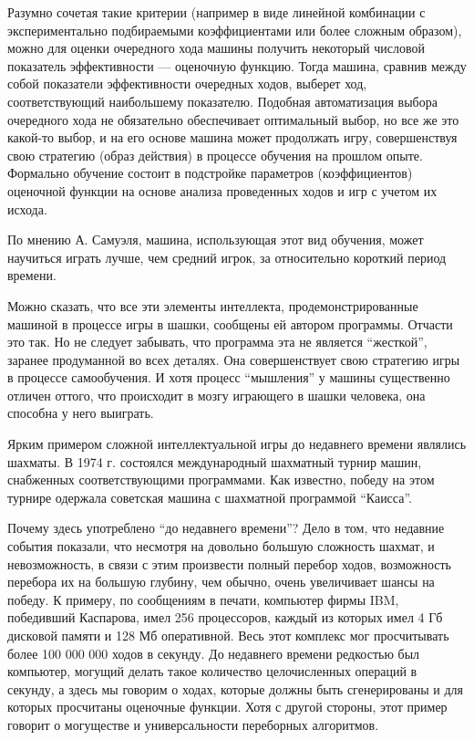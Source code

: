 Разумно сочетая такие критерии (например в виде линейной комбинации с экспериментально подбираемыми коэффициентами или более сложным образом), можно для оценки очередного хода машины получить некоторый числовой показатель эффективности — оценочную функцию. Тогда машина, сравнив между собой показатели эффективности очередных ходов, выберет ход, соответствующий наибольшему показателю. Подобная автоматизация выбора очередного хода не обязательно обеспечивает оптимальный выбор, но все же это какой-то выбор, и на его основе машина может продолжать игру, совершенствуя свою стратегию (образ действия) в процессе обучения на прошлом опыте. Формально обучение состоит в подстройке параметров (коэффициентов) оценочной функции на основе анализа проведенных ходов и игр с учетом их исхода.

По мнению А. Самуэля, машина, использующая этот вид обучения, может научиться играть лучше, чем средний игрок, за относительно короткий период времени.

Можно сказать, что все эти элементы интеллекта, продемонстрированные машиной в процессе игры в шашки, сообщены ей автором программы. Отчасти это так. Но не следует забывать, что программа эта не является ``жесткой'', заранее продуманной во всех деталях. Она совершенствует свою стратегию игры в процессе самообучения. И хотя процесс ``мышления'' у машины существенно отличен оттого, что происходит в мозгу играющего в шашки человека, она способна у него выиграть.

Ярким примером сложной интеллектуальной игры до недавнего времени являлись шахматы. В 1974 г. состоялся международный шахматный турнир машин, снабженных соответствующими программами. Как известно, победу на этом турнире одержала советская машина с шахматной программой ``Каисса''.

Почему здесь употреблено ``до недавнего времени''? Дело в том, что недавние события показали, что несмотря на довольно большую сложность шахмат, и невозможность, в связи с этим произвести полный перебор ходов, возможность перебора их на большую глубину, чем обычно, очень увеличивает шансы на победу. К примеру, по сообщениям в печати, компьютер фирмы IBM, победивший Каспарова, имел 256 процессоров, каждый из которых имел 4 Гб дисковой памяти и 128 Мб оперативной. Весь этот комплекс мог просчитывать более 100 000 000 ходов в секунду. До недавнего времени редкостью был компьютер, могущий делать такое количество целочисленных операций в секунду, а здесь мы говорим о ходах, которые должны быть сгенерированы и для которых просчитаны оценочные функции. Хотя с другой стороны, этот пример говорит о могуществе и универсальности переборных алгоритмов.

